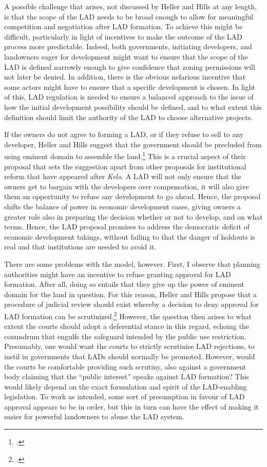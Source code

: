 A possible challenge that arises, not discussed by Heller and Hills at any length, is that the scope of the LAD needs to be broad enough to allow for meaningful competition and negotiation after LAD formation. To achieve this might be difficult, particularly in light of incentives to make the outcome of the LAD process more predictable. Indeed, both governments, initiating developers, and landowners eager for development might want to ensure that the scope of the LAD is defined narrowly enough to give confidence that zoning permissions will not later be denied. In addition, there is the obvious nefarious incentive that some actors might have to ensure that a specific development is chosen. In light of this, LAD regulation is needed to ensure a balanced approach to the issue of how the initial development possibility should be defined, and to what extent this definition should limit the authority of the LAD to choose alternative projects.

If the owners do not agree to forming a LAD, or if they refuse to sell to any developer, Heller and Hills suggest that the government should be precluded from using eminent domain to assemble the land.\footcite[1491]{heller08} This is a crucial aspect of their proposal that sets the suggestion apart from other proposals for institutional reform that have appeared after {\it Kelo}. A LAD will not only ensure that the owners get to bargain with the developers over compensation, it will also give them an opportunity to refuse any development to go ahead. Hence, the proposal shifts the balance of power in economic development cases, giving owners a greater role also in preparing the decision whether or not to develop, and on what terms. Hence, the LAD proposal promises to address the democratic deficit of economic development takings, without failing to  that the danger of holdouts is real and that institutions are needed to avoid it.

There are some problems with the model, however. First, I observe that planning authorities might have an incentive to refuse granting approval for LAD formation. After all, doing so entails that they give up the power of eminent domain for the land in question. For this reason, Heller and Hills propose that a procedure of judicial review should exist whereby a decision to deny approval for LAD formation can be scrutinized.\footcite[1490]{heller08} However, the question then arises to what extent the courts should adopt a deferential stance in this regard, echoing the conundrum that engulfs the safeguard intended by the public use restriction. Presumably, one would want the courts to strictly scrutinise LAD rejections, to instil in governments that LADs should normally be promoted. However, would the courts be comfortable providing such scrutiny, also against a government body claiming that the ``public interest'' speaks against LAD formation? This would likely depend on the exact formulation and spirit of the LAD-enabling legislation. To work as intended, some sort of presumption in favour of LAD approval appears to be in order, but this in turn can have the effect of making it easier for powerful landowners to abuse the LAD system.

